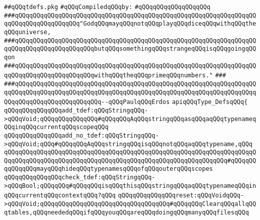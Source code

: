 \label{src/lib/c-kit/src/parser/grammar/tdefs.pkg}
\verb|##qQQqtdefs.pkg|\newline
\newline
\verb|#qQQqCompiledqQQqby:|\newline
\verb|#qQQqqQQqqQQqqQQqqQQq|\newline
\newline
\verb|###qQQqqQQqqQQqqQQqqQQqqQQqqQQqqQQqqQQqqQQqqQQqqQQqqQQqqQQqqQQqqQQqqQQqqQQqqQQqqQQqqQQqqQQq"GodqQQqmayqQQqnotqQQqplayqQQqdiceqQQqwithqQQqtheqQQquniverse,|\newline
\verb|###qQQqqQQqqQQqqQQqqQQqqQQqqQQqqQQqqQQqqQQqqQQqqQQqqQQqqQQqqQQqqQQqqQQqqQQqqQQqqQQqqQQqqQQqqQQqbutqQQqsomethingqQQqstrangeqQQqisqQQqgoingqQQqon|\newline
\verb|###qQQqqQQqqQQqqQQqqQQqqQQqqQQqqQQqqQQqqQQqqQQqqQQqqQQqqQQqqQQqqQQqqQQqqQQqqQQqqQQqqQQqqQQqqQQqwithqQQqtheqQQqprimeqQQqnumbers."|\newline
\verb|###|\newline
\verb|###qQQqqQQqqQQqqQQqqQQqqQQqqQQqqQQqqQQqqQQqqQQqqQQqqQQqqQQqqQQqqQQqqQQqqQQqqQQqqQQqqQQqqQQqqQQqqQQqqQQqqQQqqQQqqQQqqQQqqQQqqQQqqQQqqQQqqQQqqQQqqQQqqQQqqQQqqQQqqQQqqQQq--qQQqPaulqQQqErdos|\newline
\newline
\newline
\newline
\verb|apiqQQqType_DefsqQQq{|\newline
\newline
\verb|qQQqqQQqqQQqqQQqadd_tdef:qQQqStringqQQq->qQQqVoid;qQQqqQQqqQQqqQQq#qQQqqQQqAqQQqstringqQQqasqQQqaqQQqtypenameqQQqinqQQqcurrentqQQqscopeqQQq|\newline
\verb|qQQqqQQqqQQqqQQqadd_no_tdef:qQQqStringqQQq->qQQqVoid;qQQq#qQQqqQQqAqQQqstringqQQqisqQQqnotqQQqaqQQqtypename,qQQq|\newline
\verb|qQQqqQQqqQQqqQQqqQQqqQQqqQQqqQQqqQQqqQQqqQQqqQQqqQQqqQQqqQQqqQQqqQQqqQQqqQQqqQQqqQQqqQQqqQQqqQQqqQQqqQQqqQQqqQQqqQQqqQQqqQQqqQQqqQQq#qQQqqQQqqQQqqQQqmayqQQqhideqQQqtypenamesqQQqofqQQqouterqQQqscopes|\newline
\verb|qQQqqQQqqQQqqQQqcheck_tdef:qQQqStringqQQq->qQQqBool;qQQqqQQq#qQQqqQQqisqQQqthisqQQqstringqQQqaqQQqtypenameqQQqinqQQqcurrentqQQqcontextqQQq?qQQq|\newline
\verb|qQQqqQQqqQQqqQQqreset:qQQqVoidqQQq->qQQqVoid;qQQqqQQqqQQqqQQqqQQqqQQqqQQqqQQqqQQq#qQQqqQQqClearqQQqallqQQqtables,qQQqneededqQQqifqQQqyouqQQqareqQQqdoingqQQqmanyqQQqfilesqQQq|\newline
